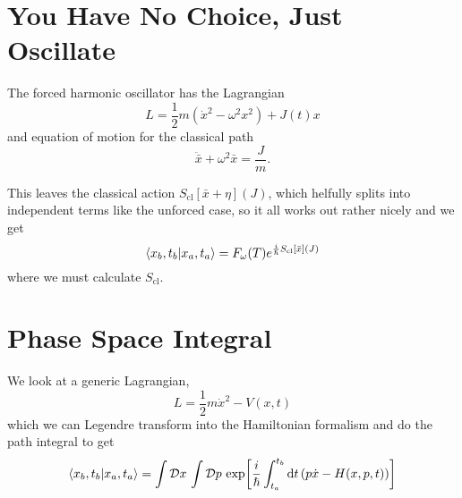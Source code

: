 \documentclass[]{scrreprt}
\renewcommand\hbar\hslash
\newcommand{\DD}[1]{\ensuremath{\mathcal{D} #1\,}}
\begin{document}
\section{You Have No Choice, Just Oscillate}
The forced harmonic oscillator has the Lagrangian
\[ L = \frac{1}{2} m (\dot{x}^2 - \omega^2 x^2) + J(t)x \]
and equation of motion for the classical path
\[ \ddot{\bar{x}} + \omega^2 \bar{x} = \frac{J}{m}. \]

This leaves the classical action \(S_\mathrm{cl}[\bar{x} + \eta](J) \), which helfully splits into independent terms like the unforced case, so it all works out rather nicely and we get
\begin{equation*}
  \braket{x_b, t_b}{x_a, t_a} = F_\omega(T)e^{\frac{i}{\hbar} S_\mathrm{cl}[\bar{x}](J)}
\end{equation*}
where we must calculate \(S_\mathrm{cl}\).

\section{Phase Space Integral}
We look at a generic Lagrangian, \[ L= \frac{1}{2} m \dot{x}^2 - V(x, t) \] which we can Legendre transform into the Hamiltonian formalism and do the path integral to get
\[ \braket{x_b, t_b}{x_a, t_a} = \int \DD{x} \int \DD{p} \exp[\frac{i}{\hbar} \int_{t_a}^{t_b} \dd{t} (p\dot{x} - H(x, p, t))] \]


\printbibliography
\end{document}
